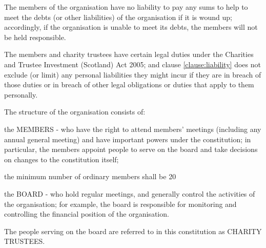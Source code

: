 ﻿\documentclass[a4paper,11pt,onecolumn ]{article}
\begin{document}

\begin{legal}
\item \label{clause:liability} The members of the organisation have no liability to pay any sums to help to meet the debts (or other liabilities) of the organisation if it is wound up; accordingly, if the organisation is unable to meet its debts, the members will not be held responsible.
 
\item The members and charity trustees have certain legal duties under the Charities and Trustee Investment (Scotland) Act 2005; and clause \ref{clause:liability} does not exclude (or limit) any personal liabilities they might incur if they are in breach of those duties or in breach of other legal obligations or duties that apply to them personally.
\end{legal}

\begin{legal}
\item The structure of the organisation consists of:
    	\begin{legal}
         \item the MEMBERS - who have the right to attend members' meetings (including any annual general meeting) and have important powers under the constitution; in particular, the members appoint people to serve on the board and take decisions on changes to the constitution itself;
            \begin{legal}
             \item the minimum number of ordinary members shall be 20
            \end{legal}
        \item the BOARD - who hold regular meetings, and generally control the activities of the organisation; for example, the board is responsible for monitoring and controlling the financial position of the organisation.
       \end{legal}

\item The people serving on the board are referred to in this constitution as CHARITY TRUSTEES. 
\end{legal}

\end{document}
